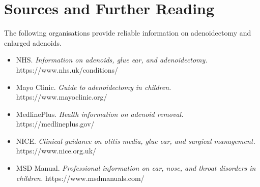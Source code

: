 \section*{Sources and Further Reading}
The following organisations provide reliable information on adenoidectomy and enlarged adenoids.

\begin{itemize}
    \item NHS. \textit{Information on adenoids, glue ear, and adenoidectomy.} https://www.nhs.uk/conditions/
    \item Mayo Clinic. \textit{Guide to adenoidectomy in children.} https://www.mayoclinic.org/
    \item MedlinePlus. \textit{Health information on adenoid removal.} https://medlineplus.gov/
    \item NICE. \textit{Clinical guidance on otitis media, glue ear, and surgical management.} https://www.nice.org.uk/
    \item MSD Manual. \textit{Professional information on ear, nose, and throat disorders in children.} https://www.msdmanuals.com/
\end{itemize}
